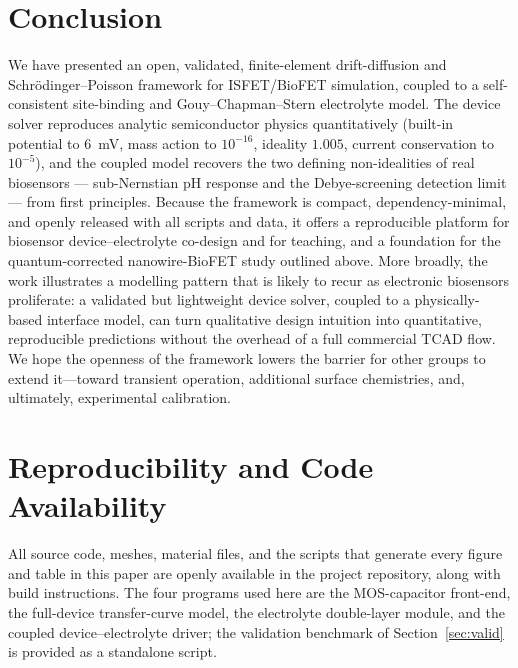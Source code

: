 \documentclass[10pt,journal]{IEEEtran}
\begin{document}
\section{Conclusion}
\label{sec:conclusion}

We have presented an open, validated, finite-element drift-diffusion and
Schr\"odinger--Poisson framework for ISFET/BioFET simulation, coupled to a
self-consistent site-binding and Gouy--Chapman--Stern electrolyte model. The
device solver reproduces analytic semiconductor physics quantitatively (built-in
potential to \SI{6}{mV}, mass action to $10^{-16}$, ideality $1.005$, current
conservation to $10^{-5}$), and the coupled model recovers the two defining
non-idealities of real biosensors --- sub-Nernstian pH response and the
Debye-screening detection limit --- from first principles. Because the framework
is compact, dependency-minimal, and openly released with all scripts and data, it
offers a reproducible platform for biosensor device--electrolyte co-design and for
teaching, and a foundation for the quantum-corrected nanowire-BioFET study
outlined above. More broadly, the work illustrates a modelling pattern that is
likely to recur as electronic biosensors proliferate: a validated but lightweight
device solver, coupled to a physically-based interface model, can turn qualitative
design intuition into quantitative, reproducible predictions without the overhead
of a full commercial TCAD flow. We hope the openness of the framework lowers the
barrier for other groups to extend it---toward transient operation, additional
surface chemistries, and, ultimately, experimental calibration.

\section*{Reproducibility and Code Availability}
All source code, meshes, material files, and the scripts that generate every
figure and table in this paper are openly available in the project repository,
along with build instructions. The four programs used here are the MOS-capacitor
front-end, the full-device transfer-curve model, the electrolyte double-layer
module, and the coupled device--electrolyte driver; the validation benchmark of
Section~\ref{sec:valid} is provided as a standalone script.

\appendices
\end{document}

